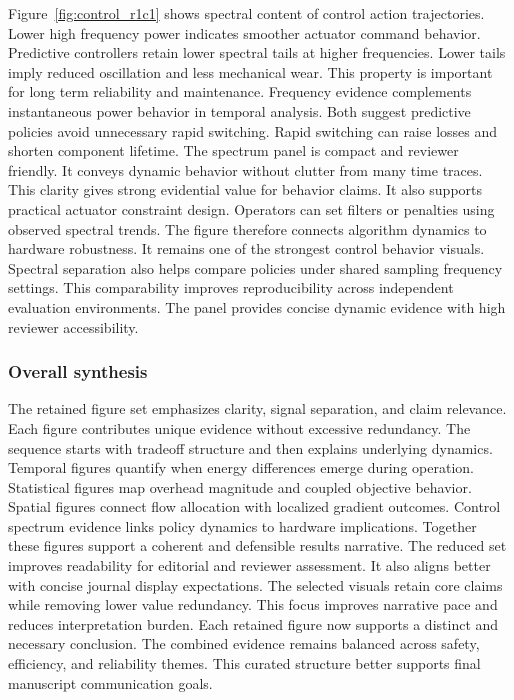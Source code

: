 \documentclass{article}
\begin{document}
Figure~\ref{fig:control_r1c1} shows spectral content of control action trajectories.
Lower high frequency power indicates smoother actuator command behavior.
Predictive controllers retain lower spectral tails at higher frequencies.
Lower tails imply reduced oscillation and less mechanical wear.
This property is important for long term reliability and maintenance.
Frequency evidence complements instantaneous power behavior in temporal analysis.
Both suggest predictive policies avoid unnecessary rapid switching.
Rapid switching can raise losses and shorten component lifetime.
The spectrum panel is compact and reviewer friendly.
It conveys dynamic behavior without clutter from many time traces.
This clarity gives strong evidential value for behavior claims.
It also supports practical actuator constraint design.
Operators can set filters or penalties using observed spectral trends.
The figure therefore connects algorithm dynamics to hardware robustness.
It remains one of the strongest control behavior visuals.
Spectral separation also helps compare policies under shared sampling frequency settings.
This comparability improves reproducibility across independent evaluation environments.
The panel provides concise dynamic evidence with high reviewer accessibility.

\subsubsection{Overall synthesis}

The retained figure set emphasizes clarity, signal separation, and claim relevance.
Each figure contributes unique evidence without excessive redundancy.
The sequence starts with tradeoff structure and then explains underlying dynamics.
Temporal figures quantify when energy differences emerge during operation.
Statistical figures map overhead magnitude and coupled objective behavior.
Spatial figures connect flow allocation with localized gradient outcomes.
Control spectrum evidence links policy dynamics to hardware implications.
Together these figures support a coherent and defensible results narrative.
The reduced set improves readability for editorial and reviewer assessment.
It also aligns better with concise journal display expectations.
The selected visuals retain core claims while removing lower value redundancy.
This focus improves narrative pace and reduces interpretation burden.
Each retained figure now supports a distinct and necessary conclusion.
The combined evidence remains balanced across safety, efficiency, and reliability themes.
This curated structure better supports final manuscript communication goals.
\end{document}
